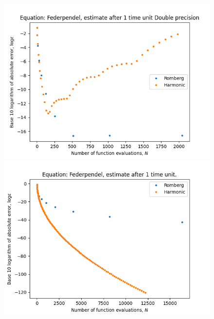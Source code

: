 \begin{figure}[H]
\centering
\begin{minipage}{0.45\textwidth}
\centering
\includegraphics[scale=0.45]{../results/emr_plots/federpendel.png}
\end{minipage}
\begin{minipage}{0.45\textwidth}
\centering
\includegraphics[scale=0.45]{../results/emr_plots/federpendel_1_hp.png}
\end{minipage}
\end{figure}

